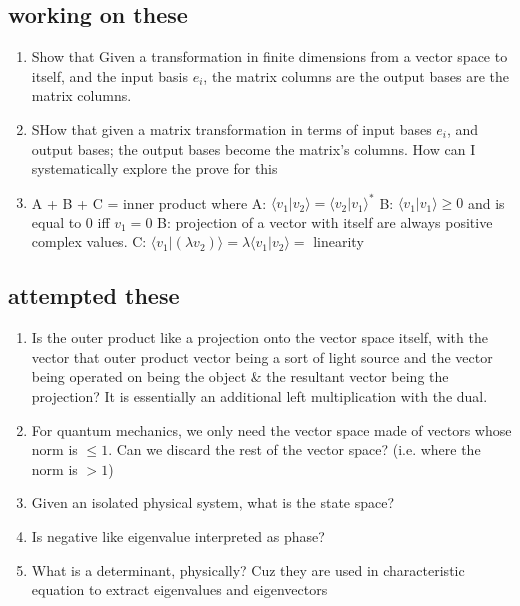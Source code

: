 \documentclass[14pt]{extarticle}
\begin{document}
\subsection*{working on these}
\begin{enumerate}
    \item Show that Given a transformation in finite dimensions from a vector space to itself, and the input basis $e_i$, the matrix columns are the output bases are the matrix columns.
    \item SHow that given a matrix transformation in terms of input bases $e_i$, and output bases; the output bases become the matrix's columns. How can I systematically explore the prove for this
    \item A + B + C = inner product where 
    \subitem A: $ \langle v_1 | v_2 \rangle = \langle v_2 | v_1 \rangle^*$ 
    \subitem B: $ \langle v_1 | v_1 \rangle \ge 0 $ and is equal to 0 iff $ v_1 = 0 $
    \subitem B: projection of a vector with itself are always positive complex values.
    \subitem C: $ \langle v_1 | (\lambda v_2)\rangle = \lambda \langle v_1 | v_2 \rangle = $ linearity
\end{enumerate}

\subsection*{attempted these}
\begin{enumerate}
    \item Is the outer product like a projection onto the vector space itself, with the vector that outer product vector being a sort of light source and the vector being operated on being the object \& the resultant vector being the projection? It is essentially an additional left multiplication with the dual.
    \item For quantum mechanics, we only need the vector space made of vectors whose norm is $\le 1$. Can we discard the rest of the vector space? (i.e. where the norm is $> 1$)
    \item Given an isolated physical system, what is the state space?
    \item Is negative like eigenvalue interpreted as phase?
    \item What is a determinant, physically? Cuz they are used in characteristic equation to extract eigenvalues and eigenvectors
\end{enumerate}
                                                                                                                                                                                                                                                                                        
\end{document}
